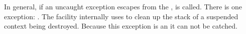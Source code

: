 \label{exceptions}

In general, if an uncaught exception escapes from the \entryfn,
 is called. There is one exception: \foreignex. The \fiber
facility internally uses \foreignex to clean up the stack of a suspended context
being destroyed. Because this exception is an \foreignex it can not be catched.
